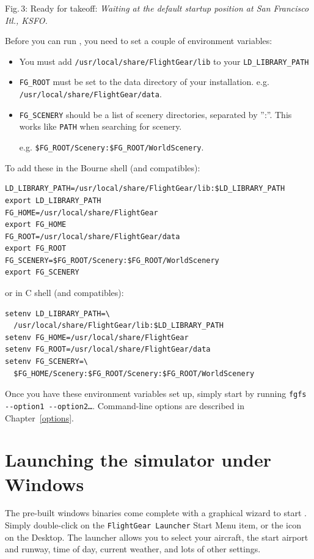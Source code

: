  \noindent
Fig.\,3: Ready for takeoff: \textit{Waiting at the default startup position at San
Francisco Itl., KSFO.}
\medskip

Before you can run \FlightGear{}, you need to set a couple of environment variables:

\begin{itemize}
\item You must add \texttt{/usr/local/share/FlightGear/lib} to your \texttt{LD\_LIBRARY\_PATH}
\item \texttt{FG\_ROOT} must be set to the data directory of your \FlightGear{} installation. e.g. \texttt{/usr/local/share/FlightGear/data}.
\item \texttt{FG\_SCENERY} should be a list of scenery directories, separated by '':''. This works like \texttt{PATH} when searching for scenery.

e.g. \texttt{\$FG\_ROOT/Scenery:\$FG\_ROOT/WorldScenery}.
\end{itemize}

\noindent
To add these in the Bourne shell (and compatibles):
\begin{verbatim}
LD_LIBRARY_PATH=/usr/local/share/FlightGear/lib:$LD_LIBRARY_PATH
export LD_LIBRARY_PATH
FG_HOME=/usr/local/share/FlightGear
export FG_HOME
FG_ROOT=/usr/local/share/FlightGear/data
export FG_ROOT
FG_SCENERY=$FG_ROOT/Scenery:$FG_ROOT/WorldScenery
export FG_SCENERY
\end{verbatim}
\noindent
 or in C shell (and compatibles):
\begin{verbatim}
setenv LD_LIBRARY_PATH=\
  /usr/local/share/FlightGear/lib:$LD_LIBRARY_PATH
setenv FG_HOME=/usr/local/share/FlightGear
setenv FG_ROOT=/usr/local/share/FlightGear/data
setenv FG_SCENERY=\
  $FG_HOME/Scenery:$FG_ROOT/Scenery:$FG_ROOT/WorldScenery
\end{verbatim}
Once you have these environment variables set up, simply start \FlightGear{} by running
\texttt{fgfs -$ $-option1 -$ $-option2\dots}.
\medskip
Command-line options are described in Chapter~\ref{options}.

\section{Launching the simulator under Windows}
The pre-built windows binaries come complete with a graphical wizard to start \FlightGear{}. Simply double-click on the \texttt{FlightGear Launcher} Start Menu item, or the icon on the Desktop. The launcher allows you to select your aircraft, the start airport and runway, time of day, current weather, and lots
of other settings.

